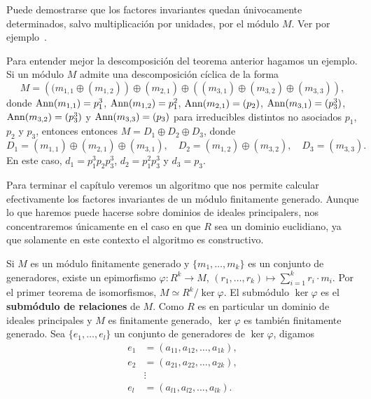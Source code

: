Puede demostrarse que los factores invariantes quedan únivocamente determinados, salvo multiplicación por unidades, por el módulo $M$. 
Ver por ejemplo~\cite[Theorem 6.13]{MR2344656}.
  
\begin{example}
Para entender mejor la descomposición del teorema anterior
hagamos un ejemplo. Si un módulo $M$ admite una descomposición cíclica de la forma 
\[
M=\left((m_{1,1}\oplus (m_{1,2})\right)\oplus (m_{2,1})\oplus \left((m_{3,1})\oplus (m_{3,2})\oplus (m_{3,3})\right),
\]
donde $\operatorname{Ann}(m_{1,1})=p_1^3$, $\operatorname{Ann}(m_{1,2})=p_1^2$, $\operatorname{Ann}(m_{2,1})=(p_2)$, $\operatorname{Ann}(m_{3,1})=(p_3^3)$, $\operatorname{Ann}(m_{3,2})=(p_3^3)$ y $\operatorname{Ann}(m_{3,3})=(p_3)$ 
para irreducibles distintos no asociados $p_1$, $p_2$ y $p_3$, entonces 
entonces $M=D_1\oplus D_2\oplus D_3$, donde 
\[
D_1=(m_{1,1})\oplus (m_{2,1})\oplus (m_{3,1}),
\quad
D_2=(m_{1,2})\oplus (m_{3,2}),\quad
D_3=(m_{3,3}).
\]
En este caso, $d_1=p_1^3p_2p_3^3$, $d_2=p_1^2p_3^3$ y $d_3=p_3$. 
\end{example}



Para terminar el capítulo veremos un algoritmo que nos permite calcular
efectivamente los factores invariantes de un módulo finitamente generado. Aunque lo que haremos puede hacerse sobre dominios
de ideales principalers, nos concentraremos únicamente en el caso
en que $R$ sea un dominio euclidiano, ya que solamente en este contexto el algoritmo es constructivo.
 
Si $M$ es un módulo finitamente generado y $\{m_1,\dots,m_k\}$ es
un conjunto de generadores,  
existe un epimorfismo $\varphi\colon R^k\to M$, $(r_1,\dots,r_k)\mapsto \sum_{i=1}^k r_i\cdot m_i$. Por el primer teorema de isomorfismos, 
$M\simeq R^k/\ker\varphi$. 
El submódulo $\ker\varphi$ es el \textbf{submódulo de relaciones} de $M$. 
Como $R$ es en particular un dominio de ideales
principales y $M$ es finitamente generado, $\ker\varphi$ es también finitamente generado. Sea 
$\{e_1,\dots,e_l\}$ un conjunto de generadores de $\ker\varphi$, digamos 
\begin{align*}
e_1&=(a_{11},a_{12},\dots,a_{1k}),\\
e_2&=(a_{21},a_{22},\dots,a_{2k}),\\
&\vdots\\
e_l&=(a_{l1},a_{l2},\dots,a_{lk}).	
\end{align*}


